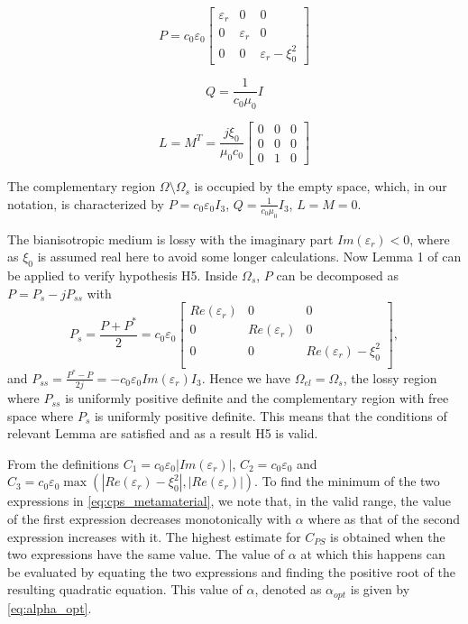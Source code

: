 \begin{equation}  \label{constitutive_kraft_P}
P = c_0 \varepsilon_0 
\begin{bmatrix}
\varepsilon_r & 0 & 0 \\
0 &  \varepsilon_r & 0 \\
0 & 0 & \varepsilon_r-\xi_0^2
\end{bmatrix} 
\end{equation}

\begin{equation} \label{constitutive_kraft_Q}
Q = \frac{1}{c_0\mu_0}I
\end{equation}

\begin{equation} \label{constitutive_kraft_LM}
L = M^T = \frac{j\xi_0}{\mu_0 c_0}
\begin{bmatrix}
0 & 0 & 0 \\
0 & 0 & 0 \\
0 &  1  & 0
\end{bmatrix} 
\end{equation}
 
The complementary region $\Omega \setminus \Omega_s$ is 
occupied by the empty space, which,  in our notation, is characterized by 
 $P=c_0\varepsilon_0I_3$, $Q=\frac{1}{c_0\mu_0}I_3$, $L=M=0$.

The bianisotropic medium is lossy with the imaginary part $Im(\varepsilon_r) < 0$, 
where as $\xi_0$ is assumed real here to avoid some longer calculations. 
Now Lemma 1 of \cite{kalarickel2020well} can be applied to verify hypothesis H5.
Inside $\Omega_s$, $P$ can be decomposed as $P= P_s -j P_{ss}$ with
\begin{equation}
P_s = \frac{P+P^*}{2} =  c_0\varepsilon_0
\begin{bmatrix}
Re(\varepsilon_r) & 0 & 0 \\
0 & Re(\varepsilon_r) & 0 \\
0 & 0 & Re(\varepsilon_r) - \xi_0^2 \\
\end{bmatrix},
\end{equation}
and  $P_{ss} = \frac{P^*-P}{2j} =  -c_0\varepsilon_0 Im(\varepsilon_r) I_3$.
Hence we have $\Omega_{el} = \Omega_s$, the lossy region 
where $P_{ss}$ is uniformly positive definite 
and the complementary region with free space where $P_s$ 
is uniformly positive definite.
This means that the conditions of relevant Lemma are satisfied and 
as a result H5 is valid.

From the definitions
$C_1=c_0\varepsilon_0 |Im(\varepsilon_r)|$, 
$C_2 = c_0\varepsilon_0$ and 
$C_3 = c_0\varepsilon_0 \max(|Re(\varepsilon_r) -\xi_0^2|, |Re(\varepsilon_r)|)$.
To find the minimum of the two expressions in \eqref{eq:cps_metamaterial},
we note that, in the valid range, the value of the 
first expression decreases monotonically with  $\alpha$ where as
that of the second expression increases with it. 
The highest estimate for $C_{PS}$  is obtained when the two expressions 
have the same value.
The value of $\alpha$ at which this happens can be evaluated by 
equating the two expressions and finding the positive 
root of the resulting quadratic equation.
This value of $\alpha$, denoted as $\alpha_{opt}$ is given by 
\eqref{eq:alpha_opt}.

